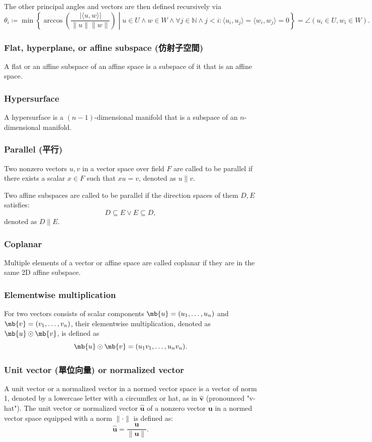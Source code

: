 \documentclass[a4paper,12pt]{report}
\begin{document}
The other principal angles and vectors are then defined recursively via
\[\theta_i\coloneq\min\left\{\arccos\left(\frac{|\langle u,w\rangle|}{\|u\|\|w\|}\right)\middle |u\in U\land w\in W\land \forall j\in\mathbb{N}\land j<i\colon\langle u_i,u_j\rangle=\langle w_i,w_j\rangle=0\right\}=\angle(u_i\in U,w_i\in W).\]
\subsubsection{Flat, hyperplane, or affine subspace (仿射子空間)}
A flat or an affine subspace of an affine space is a subspace of it that is an affine space.
\subsubsection{Hypersurface}
A hypersurface is a $(n-1)$-dimensional manifold that is a subspace of an $n$-dimensional manifold.
\subsubsection{Parallel (平行)}
Two nonzero vectors $u,v$ in a vector space over field $F$ are called to be parallel if there exists a scalar $x\in F$ such that $xu=v$, denoted as $u\parallel v$.

Two affine subspaces are called to be parallel if the direction spaces of them $D,E$ satisfies:
\[D\subseteq E\lor E\subseteq D,\]
denoted as $D\parallel E$.
\subsubsection{Coplanar}
Multiple elements of a vector or affine space are called coplanar if they are in the same 2D affine subspace.
\subsubsection{Elementwise multiplication}
For two vectors consists of scalar components $\mb{u}=(u_1,\ldots,u_n)$ and $\mb{v}=(v_1,\ldots,v_n)$, their elementwise multiplication, denoted as $\mb{u}\odot\mb{v}$, is defined as
\[\mb{u}\odot\mb{v}=(u_1v_1,\ldots,u_nv_n).\]
\subsubsection{Unit vector (單位向量) or normalized vector}
A unit vector or a normalized vector in a normed vector space is a vector of norm 1, denoted by a lowercase letter with a circumflex or hat, as in $\hat{\mathbf{v}}$ (pronounced "v-hat"). The unit vector or normalized vector $\hat{\mathbf{u}}$ of a nonzero vector $\mathbf{u}$ in a normed vector space equipped with a norm $\|\cdot\|$ is defined as:
\[\hat{\mathbf{u}}=\frac{\mathbf{u}}{\|\mathbf{u}\|}.\]
\end{document}
